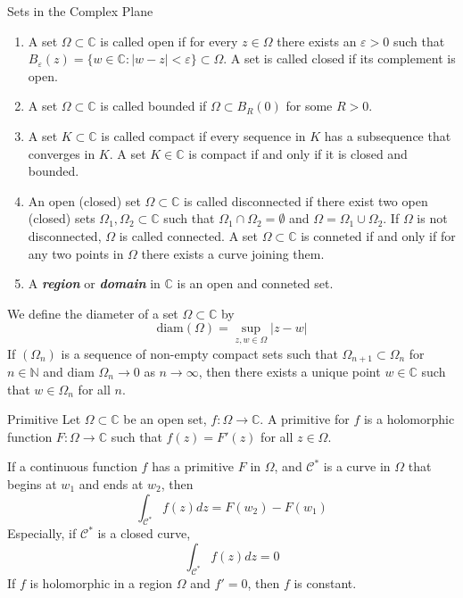 \documentclass{beamer}
\begin{document}
\begin{frame}
\begin{block}{Sets in the Complex Plane}
\begin{enumerate}
\item A set $\Omega\subset\mathbb{C} $ is called open if for every $z\in\Omega$ there exists an $\varepsilon>0$ such that $B_{\varepsilon}(z)=\lbrace w\in\mathbb{C}:|w-z|<\varepsilon\rbrace\subset\Omega$. A set is called closed if its complement is open.
\item A set $\Omega\subset\mathbb{C}$ is called bounded if $\Omega\subset B_R(0)$ for some $R>0$.
\item A set $K\subset\mathbb{C}$ is called compact if every sequence in $K$ has a subsequence that converges in $K$. A set $K\in\mathbb{C}$ is compact if and only if it is closed and bounded.
\item An open (closed) set $\Omega\subset\mathbb{C}$ is called disconnected if there exist two open (closed) sets $\Omega_1,\Omega_2\subset\mathbb{C}$ such that $\Omega_1\cap\Omega_2=\emptyset$ and $\Omega=\Omega_1\cup\Omega_2$. If $\Omega$ is not disconnected, $\Omega$ is called connected. A set $\Omega\subset\mathbb{C}$ is conneted if and only if for any two points in $\Omega$ there exists a curve joining them.
\item A \textcolor[rgb]{0,0.6,0.3}{\textit{\textbf{region}}} or \textcolor[rgb]{0,0.6,0.3}{\textit{\textbf{domain}}} in $\mathbb{C}$ is an open and conneted set.
\end{enumerate}
\end{block}
\end{frame}

\begin{frame}
\begin{block}{}
We define the diameter of a set $\Omega\subset\mathbb{C}$ by
$$\text{diam}(\Omega)=\sup_{z,w\in\Omega}|z-w|$$
If $(\Omega_n)$ is a sequence of non-empty compact sets such that $\Omega_{n+1}\subset\Omega_n$ for $n\in\mathbb{N}$ and diam $\Omega_n\rightarrow0$ as $n\rightarrow\infty$, then there exists a unique point $w\in\mathbb{C}$ such that $w\in\Omega_n$ for all $n$.
\end{block}
\end{frame}



\begin{frame}
\begin{block}{Primitive}
Let $\Omega\subset\mathbb{C}$ be an open set, $f:\Omega\rightarrow\mathbb{C}$. A primitive for $f$ is a holomorphic function $F:\Omega\rightarrow\mathbb{C}$ such that $f(z)=F'(z)$ for all $z\in\Omega$.
\end{block}

\begin{block}{}
If a continuous function $f$ has a primitive $F$ in $\Omega$, and $\mathcal{C}^*$ is a curve in $\Omega$ that begins at $w_1$ and ends at $w_2$, then
$$\int_{\mathcal{C}^*}f(z)dz=F(w_2)-F(w_1)$$
Especially, if $\mathcal{C}^*$ is a closed curve, 
$$\int_{\mathcal{C}^*}f(z)dz=0$$
If $f$ is holomorphic in a region $\Omega$ and $f'=0$, then $f$ is constant.
\end{block}
\end{frame}
\end{document}
